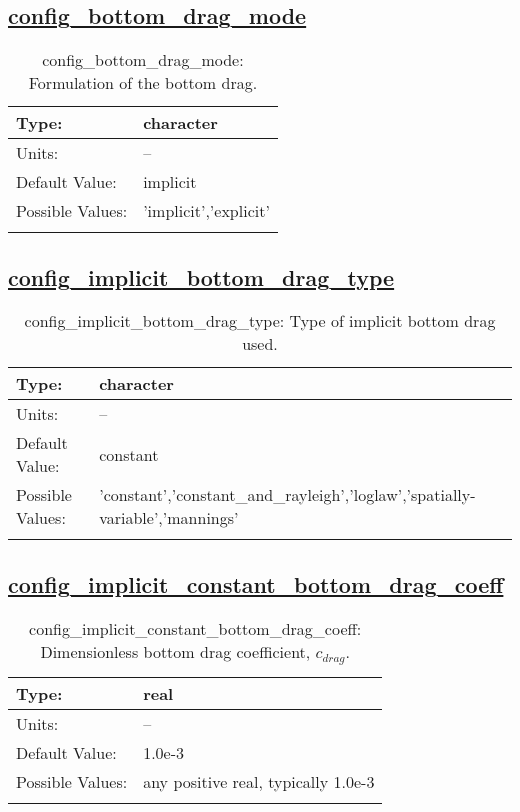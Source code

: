 \subsection[config\_bottom\_drag\_mode]{\hyperref[sec:nm_tab_bottom_drag]{config\_bottom\_drag\_mode}}
\label{subsec:nm_sec_config_bottom_drag_mode}
\begin{center}
\begin{longtable}{| p{2.0in} || p{4.0in} |}
    \hline
    Type: & character \\
    \hline
    Units: & -- \\
    \hline
    Default Value: & implicit \\
    \hline
    Possible Values: & 'implicit','explicit' \\
    \hline
    \caption{config\_bottom\_drag\_mode: Formulation of the bottom drag.}
\end{longtable}
\end{center}
\subsection[config\_implicit\_bottom\_drag\_type]{\hyperref[sec:nm_tab_bottom_drag]{config\_implicit\_bottom\_drag\_type}}
\label{subsec:nm_sec_config_implicit_bottom_drag_type}
\begin{center}
\begin{longtable}{| p{2.0in} || p{4.0in} |}
    \hline
    Type: & character \\
    \hline
    Units: & -- \\
    \hline
    Default Value: & constant \\
    \hline
    Possible Values: & 'constant','constant\_and\_rayleigh','loglaw','spatially-variable','mannings' \\
    \hline
    \caption{config\_implicit\_bottom\_drag\_type: Type of implicit bottom drag used.}
\end{longtable}
\end{center}
\subsection[config\_implicit\_constant\_bottom\_drag\_coeff]{\hyperref[sec:nm_tab_bottom_drag]{config\_implicit\_constant\_bottom\_drag\_coeff}}
\label{subsec:nm_sec_config_implicit_constant_bottom_drag_coeff}
\begin{center}
\begin{longtable}{| p{2.0in} || p{4.0in} |}
    \hline
    Type: & real \\
    \hline
    Units: & -- \\
    \hline
    Default Value: & 1.0e-3 \\
    \hline
    Possible Values: & any positive real, typically 1.0e-3 \\
    \hline
    \caption{config\_implicit\_constant\_bottom\_drag\_coeff: Dimensionless bottom drag coefficient, $c_{drag}$.}
\end{longtable}
\end{center}

